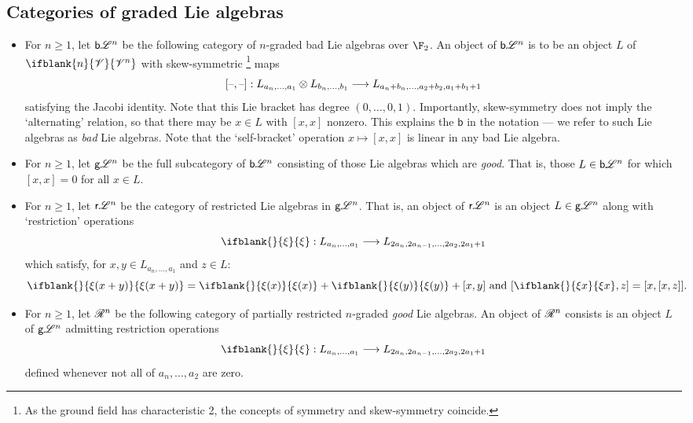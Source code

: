 \documentclass[10pt]{article}
\newcommand{\RestLie}[1]{\mathsf{r}{\scrL}^{#1}}%
\newcommand{\GoodLie}[1]{\mathsf{g}{\scrL}^{#1}}%
\newcommand{\BadLie}[1]{\mathsf{b}{\scrL}^{#1}}%
\newcommand{\PRLie}[1]{\scrR^{#1}}%
\newcommand{\GR}[1]{\ifblank{#1}{\scrV}{\scrV^{#1}}}
\newcommand{\restn}[2][]{\ifblank{#1}{\xi{#2}}{\xi_{#1}{#2}}}%
\begin{document}
\begin{CategoriesOfInterest}
\subsection{Categories of graded Lie algebras}

\begin{itemize}
\setlength{\parindent}{.25in}
\item For $n\geq1$, let $\BadLie{n}$ be the following category of $n$-graded bad Lie algebras over $\F_2$. An object of $\BadLie{n}$ is to be an object $L$ of $\GR{n}$ with skew-symmetric%
\footnote{As the ground field has characteristic 2, the concepts of symmetry and skew-symmetry coincide.} maps
\[[\textup{--},\textup{--}]:L_{a_n,\ldots,a_1}\otimes L_{b_n,\ldots,b_1}\longrightarrow L_{a_n+b_n,\ldots,a_2+b_2,a_1+b_1+1}\]
satisfying the Jacobi identity. Note that this Lie bracket has degree $(0,\ldots,0,1)$. Importantly, skew-symmetry does not imply the `alternating' relation, so that there may be $x\in L$ with $[x,x]$ nonzero. This explains the $\mathsf{b}$ in the notation --- we refer to such Lie algebras as \emph{bad} Lie algebras.
Note that the `self-bracket' operation $x\mapsto [x,x]$ is linear in any bad Lie algebra.
\item For $n\geq1$, let $\GoodLie{n}$ be the full subcategory of $\BadLie{n}$ consisting of those Lie algebras which are \emph{good}. That is, those $L\in\BadLie{n}$ for which $[x,x]=0$ for all $x\in L$.
\item For $n\geq1$, let $\RestLie{n}$ be the category of restricted Lie algebras in $\GoodLie{n}$. That is, an object of $\RestLie{n}$ is an object $L\in\GoodLie{n}$ along with `restriction' operations
\[\restn{}:L_{a_n,\ldots,a_1}\to L_{2a_n,2a_{n-1},\ldots,2a_2,2a_1+1}\]
which satisfy, for $x,y\in L_{a_n,\ldots,a_1}$ and $z\in L$: \[\restn{(x+y)}=\restn{(x)}+\restn{(y)}+[x,y]\textup{ and }[\restn{x},z]=[x,[x,z]].\]
\item For $n\geq1$, let $\PRLie{n}$ be the following category of partially restricted $n$-graded \emph{good} Lie algebras. An object of $\PRLie{n}$ consists is an object $L$ of $\GoodLie{n}$
admitting restriction operations
\[\restn{}:L_{a_n,\ldots,a_1}\to L_{2a_n,2a_{n-1},\ldots,2a_2,2a_1+1}\]
defined whenever not all of $a_n,\ldots,a_{2}$ are zero. %

\end{itemize}
\end{CategoriesOfInterest}
\end{document}

